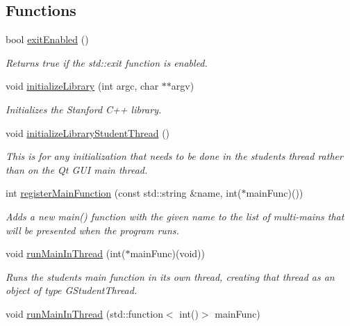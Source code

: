 \subsection*{Functions}
\begin{DoxyCompactItemize}
\item 
bool \mbox{\hyperlink{namespacestanfordcpplib_a5bb1fbda6b82680cc8f04064e55a85c6}{exit\+Enabled}} ()
\begin{DoxyCompactList}\small\item\em Returns true if the std\+::exit function is enabled. \end{DoxyCompactList}\item 
void \mbox{\hyperlink{namespacestanfordcpplib_ab36f2e19ed11765f2b025cc8e4636010}{initialize\+Library}} (int argc, char $\ast$$\ast$argv)
\begin{DoxyCompactList}\small\item\em Initializes the Stanford C++ library. \end{DoxyCompactList}\item 
void \mbox{\hyperlink{namespacestanfordcpplib_a7f8902f8cc454ef116685dbc6008704a}{initialize\+Library\+Student\+Thread}} ()
\begin{DoxyCompactList}\small\item\em This is for any initialization that needs to be done in the student\textquotesingle{}s thread rather than on the Qt G\+UI main thread. \end{DoxyCompactList}\item 
int \mbox{\hyperlink{namespacestanfordcpplib_ac7f9e21c9018a3022a368fd03c7ac337}{register\+Main\+Function}} (const std\+::string \&name, int($\ast$main\+Func)())
\begin{DoxyCompactList}\small\item\em Adds a new main() function with the given name to the list of multi-\/mains that will be presented when the program runs. \end{DoxyCompactList}\item 
void \mbox{\hyperlink{namespacestanfordcpplib_ab6f7bb8a7230f2d95cf1ff0d6f2fbf0e}{run\+Main\+In\+Thread}} (int($\ast$main\+Func)(void))
\begin{DoxyCompactList}\small\item\em Runs the student\textquotesingle{}s main function in its own thread, creating that thread as an object of type G\+Student\+Thread. \end{DoxyCompactList}\item 
void \mbox{\hyperlink{namespacestanfordcpplib_a371bf0cfbf0eedf6a653e89a563d6a40}{run\+Main\+In\+Thread}} (std\+::function$<$ int()$>$ main\+Func)
$$
\end{DoxyCompactItemize}
